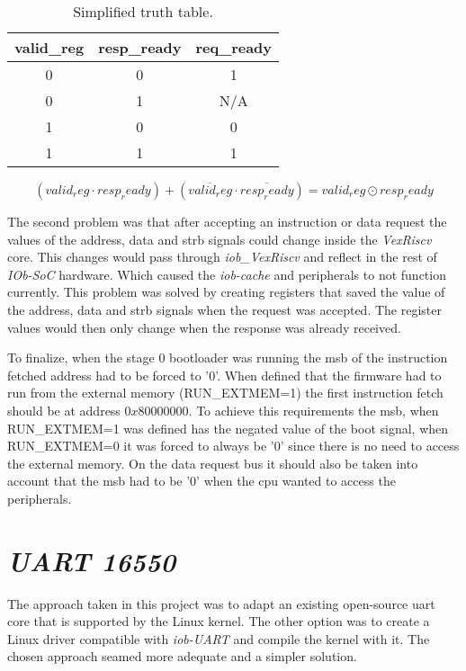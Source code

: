 \begin{table}[!ht]
  \centering
  \begin{tabular}{cc|c}
  valid\_reg & resp\_ready & req\_ready \\ \hline
  0          & 0           & 1          \\
  0          & 1           & N/A        \\
  1          & 0           & 0          \\
  1          & 1           & 1         
  \end{tabular}
  \caption{Simplified truth table.}
  \label{tab:simple_truth_table}
\end{table}

\begin{equation}
  (valid_reg \cdot resp_ready) + (\overline{valid_reg} \cdot \overline{resp_ready}) = valid_reg \odot resp_ready
  \label{eq:simple_logic_eq}
\end{equation}

The second problem was that after accepting an instruction or data request the values of the address, data and strb signals could change inside the \textit{VexRiscv} core. This changes would pass through \textit{iob\_VexRiscv} and reflect in the rest of \textit{IOb-SoC} hardware. Which caused the \textit{iob-cache} and peripherals to not function currently. This problem was solved by creating registers that saved the value of the address, data and strb signals when the request was accepted. The register values would then only change when the response was already received. 

To finalize, when the stage 0 bootloader was running the \acrfull{msb} of the instruction fetched address had to be forced to '0'. When defined that the firmware had to run from the external memory (RUN\_EXTMEM=1) the first instruction fetch should be at address $0x80000000$. To achieve this requirements the \acrfull{msb}, when RUN\_EXTMEM=1 was defined has the negated value of the boot signal, when RUN\_EXTMEM=0 it was forced to always be '0' since there is no need to access the external memory. On the data request bus it should also be taken into account that the \acrshort{msb} had to be '0' when the \acrshort{cpu} wanted to access the peripherals.

\section{\textit{UART 16550}}
The approach taken in this project was to adapt an existing open-source \acrfull{uart} core that is supported by the Linux kernel. The other option was to create a Linux driver compatible with \textit{iob-UART} and compile the kernel with it. The chosen approach seamed more adequate and a simpler solution.

